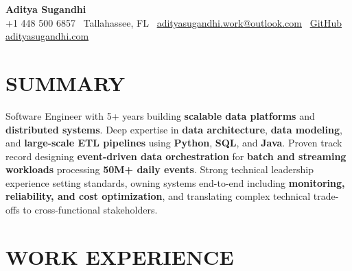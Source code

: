 \documentclass[letterpaper,10pt]{article}
\begin{document}
\begin{center}
{\huge\textbf{Aditya Sugandhi}} \\
+1 448 500 6857 \textbar\ \textcolor{metablue}{Tallahassee, FL} \textbar\
\href{mailto:adityasugandhi.work@outlook.com}{adityasugandhi.work@outlook.com} \textbar\
\href{https://github.com/adityasugandhi}{GitHub}
\textbar \href{https://adityasugandhi.com}{adityasugandhi.com}
\end{center}
\vspace{-12pt}

\section{\textcolor{metablue}{SUMMARY}}
\small
\vspace{-6pt}
Software Engineer with 5+ years building \textbf{scalable data platforms} and \textbf{distributed systems}. Deep expertise in \textbf{data architecture}, \textbf{data modeling}, and \textbf{large-scale ETL pipelines} using \textbf{Python}, \textbf{SQL}, and \textbf{Java}. Proven track record designing \textbf{event-driven data orchestration} for \textbf{batch and streaming workloads} processing \textbf{50M+ daily events}. Strong technical leadership experience setting standards, owning systems end-to-end including \textbf{monitoring, reliability, and cost optimization}, and translating complex technical trade-offs to cross-functional stakeholders.

\vspace{-9pt}

\section{\textcolor{metablue}{WORK EXPERIENCE}}
\vspace{-10pt}
\end{document}

